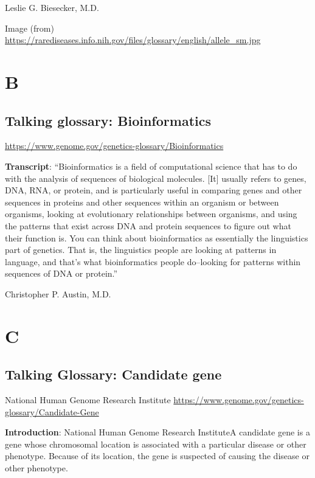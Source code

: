 \documentclass[
]{book}
\begin{document}
Leslie G. Biesecker, M.D.

Image (from)
\url{https://rarediseases.info.nih.gov/files/glossary/english/allele_sm.jpg}

\hypertarget{b}{%
\chapter{B}\label{b}}

\hypertarget{talking-glossary-bioinformatics}{%
\section{Talking glossary: Bioinformatics}\label{talking-glossary-bioinformatics}}

\url{https://www.genome.gov/genetics-glossary/Bioinformatics}

\textbf{Transcript}: ``Bioinformatics is a field of computational science that has to do with the analysis of sequences of biological molecules. {[}It{]} usually refers to genes, DNA, RNA, or protein, and is particularly useful in comparing genes and other sequences in proteins and other sequences within an organism or between organisms, looking at evolutionary relationships between organisms, and using the patterns that exist across DNA and protein sequences to figure out what their function is. You can think about bioinformatics as essentially the linguistics part of genetics. That is, the linguistics people are looking at patterns in language, and that's what bioinformatics people do--looking for patterns within sequences of DNA or protein.''

Christopher P. Austin, M.D.

\hypertarget{c}{%
\chapter{C}\label{c}}

\hypertarget{talking-glossary-candidate-gene}{%
\section{Talking Glossary: Candidate gene}\label{talking-glossary-candidate-gene}}

National Human Genome Research Institute
\url{https://www.genome.gov/genetics-glossary/Candidate-Gene}

\textbf{Introduction}: National Human Genome Research InstituteA candidate gene is a gene whose chromosomal location is associated with a particular disease or other phenotype. Because of its location, the gene is suspected of causing the disease or other phenotype.
\end{document}
